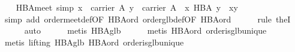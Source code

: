 \begin{isabellebody}
{\isafoldproof}%
%
\isadelimproof
\isanewline
%
\endisadelimproof
\isanewline
\ \ \isamarkupfalse%
\ HBA{}meet\ {}simp{}{}\ {}{}x\ {}\ carrier\ A{}\ y\ {}\ carrier\ A{}\ {}\ x\ {}\isactrlbsub HBA\isactrlesub \ y\ {}\ x{}y{}\isanewline
%
\isadelimproof
\ \ \ \ %
\endisadelimproof
%
\isatagproof
{}\isamarkupfalse%
\ {}simp\ add{}\ order{}meet{}def{}OF\ HBA{}ord{}\ order{}glb{}def{}OF\ HBA{}ord{}{}\isanewline
\ \ \ \ \isamarkupfalse%
\ {}rule\ the{}I{}{}\isanewline
\ \ \ \ \isamarkupfalse%
\ auto\isanewline
\ \ \ \ \isamarkupfalse%
\ {}metis\ HBA{}glb{}\isanewline
\ \ \ \ \isamarkupfalse%
\ {}metis\ HBA{}ord\ order{}is{}glb{}unique{}\isanewline
\ \ \ \ \isamarkupfalse%
\ {}metis\ {}lifting{}\ HBA{}glb\ HBA{}ord\ order{}is{}glb{}unique{}%

\end{isabellebody}
